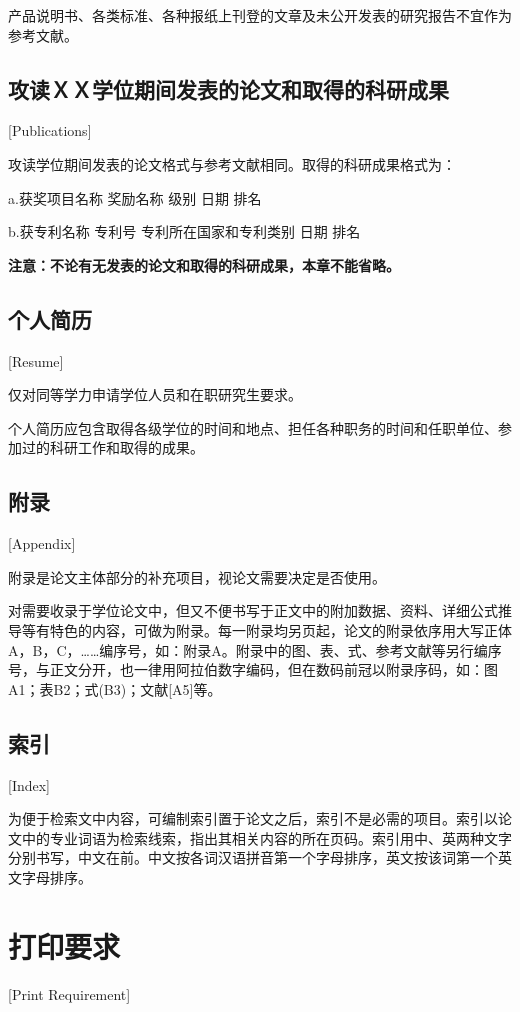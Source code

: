 产品说明书、各类标准、各种报纸上刊登的文章及未公开发表的研究报告不宜作为参考文献。

\subsection{攻读ＸＸ学位期间发表的论文和取得的科研成果}[Publications]

攻读学位期间发表的论文格式与参考文献相同。取得的科研成果格式为：

a.获奖项目名称 \quad 奖励名称 \quad 级别 \quad 日期 \quad 排名

b.获专利名称 \quad 专利号 \quad 专利所在国家和专利类别 \quad 日期 \quad 排名

\textbf{注意：不论有无发表的论文和取得的科研成果，本章不能省略。}

\subsection{个人简历}[Resume]

仅对同等学力申请学位人员和在职研究生要求。

个人简历应包含取得各级学位的时间和地点、担任各种职务的时间和任职单位、参加过的科研工作和取得的成果。

\subsection{附录}[Appendix]

附录是论文主体部分的补充项目，视论文需要决定是否使用。

对需要收录于学位论文中，但又不便书写于正文中的附加数据、资料、详细公式推导等有特色的内容，可做为附录。每一附录均另页起，论文的附录依序用大写正体A，B，C，……编序号，如：附录A。附录中的图、表、式、参考文献等另行编序号，与正文分开，也一律用阿拉伯数字编码，但在数码前冠以附录序码，如：图A1；表B2；式(B3)；文献[A5]等。

\subsection{索引}[Index]

为便于检索文中内容，可编制索引置于论文之后，索引不是必需的项目。索引以论文中的专业词语为检索线索，指出其相关内容的所在页码。索引用中、英两种文字分别书写，中文在前。中文按各词汉语拼音第一个字母排序，英文按该词第一个英文字母排序。

\section{打印要求}[Print Requirement]

